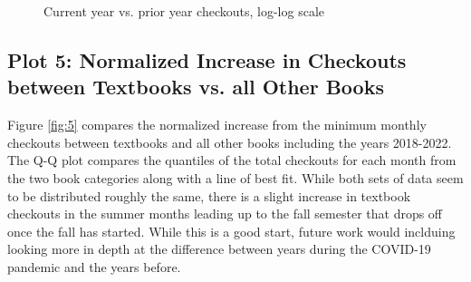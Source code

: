 \documentclass[10pt]{article}\usepackage[]{graphicx}\usepackage[]{xcolor}
\makeatletter
\newenvironment{kframe}{%
 \def\at@end@of@kframe{}%
 \ifinner\ifhmode%
  \def\at@end@of@kframe{\end{minipage}}%
  \begin{minipage}{\columnwidth}%
 \fi\fi%
 \def\FrameCommand##1{\hskip\@totalleftmargin \hskip-\fboxsep
 \colorbox{shadecolor}{##1}\hskip-\fboxsep
     \hskip-\linewidth \hskip-\@totalleftmargin \hskip\columnwidth}%
 \MakeFramed {\advance\hsize-\width
   \@totalleftmargin\z@ \linewidth\hsize
   \@setminipage}}%
 {\par\unskip\endMakeFramed%
 \at@end@of@kframe}
\newenvironment{knitrout}{}{} %
\makeatother
\begin{document}
\begin{figure}[H]
\begin{center}
\begin{knitrout}
\color{fgcolor}\begin{kframe}


{\ttfamily\noindent\bfseries{}}

{\ttfamily\noindent\bfseries\color{errorcolor}{\#\# Error in is.data.frame(data): object 'curr\_prev\_year\_counts' not found}}

{\ttfamily\noindent\bfseries\color{errorcolor}{\#\# Error in plot(curr\_prev\_year\_counts\$prev, curr\_prev\_year\_counts\$curr, : object 'curr\_prev\_year\_counts' not found}}

{\ttfamily\noindent\bfseries{}}\end{kframe}
\end{knitrout}
\end{center}
\caption{Current year vs. prior year checkouts, log-log scale}\label{fig:4}
\end{figure}


\subsection{Plot 5: Normalized Increase in Checkouts between Textbooks vs. all Other Books}

Figure \ref{fig:5} compares the normalized increase from the minimum monthly checkouts between textbooks and all other books including the years 2018-2022. The Q-Q plot compares the quantiles of the total checkouts for each month from the two book categories along with a line of best fit. While both sets of data seem to be distributed roughly the same, there is a slight increase in textbook checkouts in the summer months leading up to the fall semester that drops off once the fall has started. While this is a good start, future work would inclduing looking more in depth at the difference between years during the COVID-19 pandemic and the years before.
\end{document}
